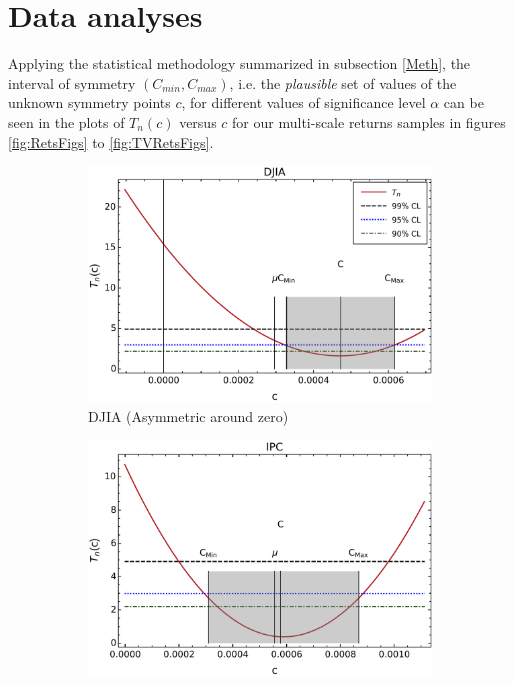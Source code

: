 \documentclass{elsarticle}
\begin{document}
\section{Data analyses}
\label{sec:analisis}
Applying the statistical methodology summarized in subsection \ref{Meth}, the interval of symmetry $(C_{min},C_{max})$, i.e. the {\em plausible} set of values of the unknown symmetry points $c$, for different values of significance level $\alpha$ can be seen in the plots of $T_{n}(c)$ versus $c$ for our multi-scale returns samples in figures \ref{fig:RetsFigs} to \ref{fig:TVRetsFigs}.

\begin{figure}[h!tb]
	\centering
        \begin{subfigure}[b]{0.45\textwidth}
            \centering
            \includegraphics[width=\textwidth]{figures/SymmetryPlots/simetria_retornos_simples_DJIA.pdf}
            \caption[ ]%
            {{\small DJIA (Asymmetric around zero)}}
            \label{fig:RetsFigsDJIA}
        \end{subfigure}
        \quad
        \begin{subfigure}[b]{0.45\textwidth}
            \centering 
            \includegraphics[width=\textwidth]{figures/SymmetryPlots/simetria_retornos_simples_IPC.pdf}

\end{subfigure}
\end{figure}
\end{document}
